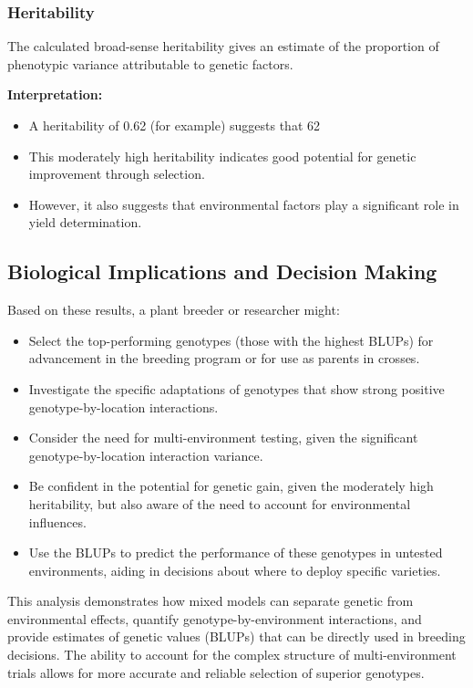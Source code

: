 \documentclass[12pt,a4paper]{article}
\begin{document}
\subsubsection{Heritability}

The calculated broad-sense heritability gives an estimate of the proportion of phenotypic variance attributable to genetic factors.

\textbf{Interpretation:}
\begin{itemize}
    \item A heritability of 0.62 (for example) suggests that 62%
    \item This moderately high heritability indicates good potential for genetic improvement through selection.
    \item However, it also suggests that environmental factors play a significant role in yield determination.
\end{itemize}

\subsection{Biological Implications and Decision Making}

Based on these results, a plant breeder or researcher might:

\begin{itemize}
    \item Select the top-performing genotypes (those with the highest BLUPs) for advancement in the breeding program or for use as parents in crosses.
    \item Investigate the specific adaptations of genotypes that show strong positive genotype-by-location interactions.
    \item Consider the need for multi-environment testing, given the significant genotype-by-location interaction variance.
    \item Be confident in the potential for genetic gain, given the moderately high heritability, but also aware of the need to account for environmental influences.
    \item Use the BLUPs to predict the performance of these genotypes in untested environments, aiding in decisions about where to deploy specific varieties.
\end{itemize}

This analysis demonstrates how mixed models can separate genetic from environmental effects, quantify genotype-by-environment interactions, and provide estimates of genetic values (BLUPs) that can be directly used in breeding decisions. The ability to account for the complex structure of multi-environment trials allows for more accurate and reliable selection of superior genotypes.
\end{document}
